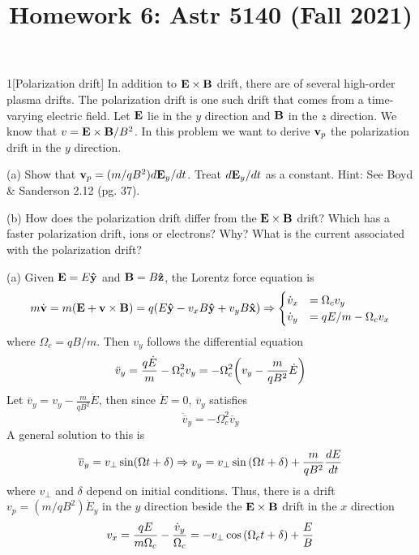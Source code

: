 \documentclass[12pt]{article}
\title{Homework 6: Astr 5140 (Fall 2021)}
\begin{document}
\maketitle
\begin{problem}{1}[Polarization drift]
In addition to $\vb{E}\times\vb{B}$ drift, there are of several high-order
plasma drifts. The polarization drift is one such drift that comes from a
time-varying electric field. Let $\vb{E}$ lie in the $y$ direction and $\vb{B}$
in the $z$ direction. We know that $v=\vb{E}\times\vb{B}/B^2$. In this problem
we want to derive $\vb{v}_p$ the polarization drift in the $y$ direction.

(a) Show that $\vb{v}_p=(m /qB^2)d\vb{E}_y /dt$. Treat $d\vb{E}_y /dt$ as a
constant. Hint: See Boyd \& Sanderson 2.12 (pg. 37).

(b) How does the polarization drift differ from the $\vb{E}\times\vb{B}$ drift?
Which has a faster polarization drift, ions or electrons? Why? What is the
current associated with the polarization drift?
\begin{solution}
(a) Given $\vb{E}=E\vb{\hat{y}}$ and $\vb{B}=B\vb{\hat{z}}$, the Lorentz force equation is
\begin{equation}
    m\dot{\vb{v}}=m\qty(\vb{E}+\vb{v}\times\vb{B})=q(E\vb{\hat{y}}-v_xB\vb{\hat{y}}+v_yB\vb{\hat{x}}) 
    \Rightarrow
    \begin{cases}
        \dot{v}_x&=\Omega_cv_y\\
        \dot{v}_y&=qE/m-\Omega_cv_x
    \end{cases}
\end{equation}
where $\Omega_c=qB/m$. Then $v_y$ follows the differential equation
\begin{equation}
    \ddot{v}_y=\frac{q\dot{E}}{m}-\Omega_c^2v_y=
    -\Omega_c^2\qty(v_y-\frac{m}{qB^2}\dot{E})
\end{equation}
Let $\overline{v}_y=v_y-\frac{m}{qB^2}\dot{E}$, then since $\ddot{E}=0$,
$\overline{v}_y$ satisfies
\begin{equation}
    \ddot{\overline{v}}_y=-\Omega_c^2\overline{v}_y 
\end{equation}
A general solution to this is
\begin{equation}
    \overline{v}_y=v_\perp \sin(\Omega t+\delta)\Rightarrow
    v_y=v_\perp\sin\qty(\Omega t+\delta)+\frac{m}{qB^2}\frac{dE}{dt}
\end{equation}
where $v_\perp$ and $\delta$ depend on initial conditions. Thus, there is a
drift $v_p=(m/qB^2)\dot{E}_y$ in the $y$ direction beside the
$\vb{E}\times\vb{B}$ drift in the $x$ direction
\begin{equation}
    v_x=\frac{qE}{m\Omega_c}-\frac{\dot{v}_y}{\Omega_c}=-v_\perp\cos\qty(\Omega_ct+\delta)+\frac{E}{B}
\end{equation}


\end{solution}
\end{problem}
\end{document}
